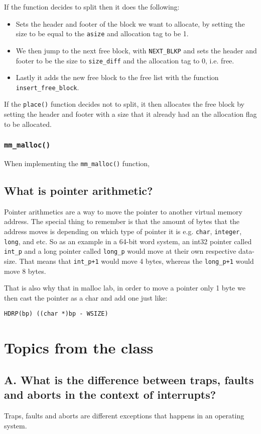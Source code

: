 \documentclass[11pt]{article}
\newcommand{\code}[1]{{\colorbox{lightgray!15}{\color{black}\texttt{#1}}}}
\begin{document}
If the function decides to split then it does the following: 
\begin{itemize}
    \item Sets the header and footer of the block we want to allocate, by setting the size to be equal to the \code{asize} and allocation tag to be 1.
    \item We then jump to the next free block, with \code{NEXT\_BLKP} and sets the header and footer to be the size to \code{size\_diff} and the allocation tag to 0, i.e. free.
    \item Lastly it adds the new free block to the free list with the function \code{insert\_free\_block}.
\end{itemize}

If the \code{place()} function decides not to split, it then allocates the free block by setting the header and footer with a size that it already had an the allocation flag to be allocated.


\subsubsection{\code{mm\_malloc()}}
When implementing the \code{mm\_malloc()} function, 

\subsection{What is pointer arithmetic?}
Pointer arithmetics are a way to move the pointer to another virtual memory address. The special thing to remember is that the amount of bytes 
that the address moves is depending on which type of pointer it is e.g. \code{char}, \code{integer}, \code{long}, and etc.
So as an example in a 64-bit word system, an int32 pointer called \code{int\_p} and a long pointer called \code{long\_p} would move at their own respective data-size.
That means that \code{int\_p+1} would move 4 bytes, whereas the \code{long\_p+1} would move 8 bytes.

That is also why that in malloc lab, in order to move a pointer only 1 byte we then cast the pointer as a char and add one just like: 

\code{HDRP(bp) ((char *)bp - WSIZE)}

\section{Topics from the class}

\subsection{A. What is the difference between traps, faults and aborts in the context of interrupts?}
Traps, faults and aborts are different exceptions that happens in an operating system.
\end{document}
